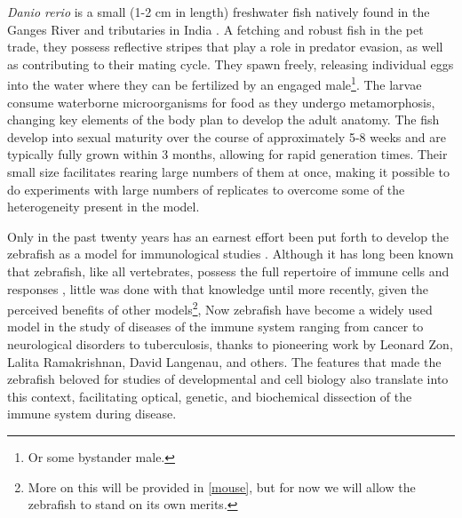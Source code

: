 \textit{Danio rerio} is a small (1-2 cm in length) freshwater fish natively found in the Ganges River and tributaries in India \citep{Engeszer2007, Arunachalam2013, Parichy2015}. A fetching and robust fish in the pet trade, they possess reflective stripes that play a role in predator evasion, as well as contributing to their mating cycle. They spawn freely, releasing individual eggs into the water where they can be fertilized by an engaged male\footnote{Or some bystander male.}. The larvae consume waterborne microorganisms for food as they undergo metamorphosis, changing key elements of the body plan to develop the adult anatomy. The fish develop into sexual maturity over the course of approximately 5-8 weeks and are typically fully grown within 3 months, allowing for rapid generation times. Their small size facilitates rearing large numbers of them at once, making it possible to do experiments with large numbers of replicates to overcome some of the heterogeneity present in the model.

Only in the past twenty years has an earnest effort been put forth to develop the zebrafish as a model for immunological studies \citep{Hsu2004, Davis2002, Langenau2003}. Although it has long been known that zebrafish, like all vertebrates, possess the full repertoire of immune cells and responses \citep{LugoVillarino2010, Liongue2009}, little was done with that knowledge until more recently, given the perceived benefits of other models\footnote{More on this will be provided in \autoref{mouse}, but for now we will allow the zebrafish to stand on its own merits.}, Now zebrafish have become a widely used model in the study of diseases of the immune system ranging from cancer to neurological disorders to tuberculosis, thanks to pioneering work by Leonard Zon, Lalita Ramakrishnan, David Langenau, and others. The features that made the zebrafish beloved for studies of developmental and cell biology also translate into this context, facilitating optical, genetic, and biochemical dissection of the immune system during disease.

